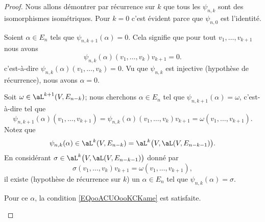 \begin{proof}
	Nous allons démontrer par récurrence sur \( k\) que tous les \( \psi_{n,k}\) sont des isomorphismes isométriques. Pour \( k=0\) c'est évident parce que \( \psi_{n,0}\) est l'identité.

	\begin{subproof}
		\spitem[Injective]
		Soient \( \alpha\in E_n\) tels que \( \psi_{n,k+1}(\alpha)=0\). Cela signifie que pour tout \( v_1,\ldots, v_{k+1}\) nous avons
		\begin{equation}
			\psi_{n,k}(\alpha)(v_1,\ldots, v_k)v_{k+1}=0.
		\end{equation}
		c'est-à-dire \( \psi_{n,k}(\alpha)(v_1,\ldots, v_{k})=0\). Vu que \( \psi_{n,k}\) est injective (hypothèse de récurrence), nous avons \( \alpha=0\).

		\spitem[Surjective]
		Soit \( \omega\in \aL^{k+1}(V,E_{n-k})\); nous cherchons \( \alpha\in E_n\) tel que \( \psi_{n,k+1}(\alpha)=\omega\), c'est-à-dire tel que
		\begin{equation}        \label{EQooACUOooKCKame}
			\psi_{n,k+1}(\alpha)(v_1,\ldots, v_{k+1})=\psi_{n,k}(\alpha)(v_1,\ldots, v_k)v_{k+1}=\omega(v_1,\ldots, v_{k+1}).
		\end{equation}
		Notez que
		\begin{equation}
			\psi_{n,k}(\alpha)\in \aL^k(V,E_{n-k})=\aL^k\big( V,\aL(V,E_{n-k-1}) \big).
		\end{equation}
		En considérant \( \sigma\in \aL^k\big( V,\aL(V,E_{n-k-1}) \big)\) donné par
		\begin{equation}
			\sigma(v_1,\ldots, v_k)v_{k+1}=\omega(v_1,\ldots, v_{k+1}),
		\end{equation}
		il existe (hypothèse de récurrence sur \( k\)) un \( \alpha\in E_n\) tel que \( \psi_{n,k}(\alpha)=\sigma\).

		Pour ce \( \alpha\), la condition \eqref{EQooACUOooKCKame} est satisfaite.


\end{subproof}
\end{proof}
